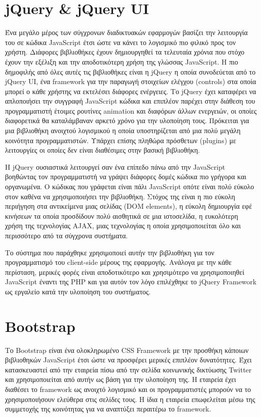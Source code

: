 \section {jQuery \& jQuery UI}
Ένα μεγάλο μέρος των σύγχρονων διαδικτυακών εφαρμογών βασίζει την λειτουργία του σε κώδικα JavaScript έτσι ώστε να κάνει το λογισμικό πιο φιλικό προς τον χρήστη. Διάφορες βιβλιοθήκες έχουν δημιουργηθεί τα τελευταία χρόνια που στόχο έχουν την εξέλιξη και την αποδοτικότερη χρήση της γλώσσας JavaScript. Η πιο δημοφιλής από όλες αυτές τις βιβλιοθήκες είναι η jQuery η οποία συνοδεύεται από το jQuery UI, ένα framework για την παραγωγή στοιχείων ελέγχου (controls) στα οποία μπορεί ο κάθε χρήστης να εκτελέσει διάφορες ενέργειες. Το jQuery έχει καταφέρει να απλοποιήσει την συγγραφή JavaScript κώδικα και επιπλέον παρέχει στην διάθεση του προγραμματιστή έτοιμες ρουτίνες animation και διαφόρων άλλων ενεργειών, οι οποίες διαφορετικά θα καταλάμβαναν αρκετό χρόνο για την υλοποίηση τους. Πρόκειται για μια βιβλιοθήκη ανοιχτού λογισμικού η οποία υποστηρίζεται από μια πολύ μεγάλη κοινότητα προγραμματιστών. Υπάρχει επίσης πληθώρα πρόσθετων (plugins) με λειτουργίες οι οποίες δεν είναι διαθέσιμες στην βασική βιβλιοθήκη.

Η jQuery ουσιαστικά λειτουργεί σαν ένα επίπεδο πάνω από την JavaScript βοηθώντας τον προγραμματιστή να γράψει διάφορες δομές κώδικα πιο γρήγορα και οργανωμένα. Ο κώδικας που γράφεται είναι πάλι JavaScript οπότε είναι πολύ εύκολο στον καθένα να χρησιμοποιήσει την βιβλιοθήκη. Στόχος της είναι η πιο εύκολη περιήγηση στα αντικείμενα μιας σελίδας (DOM elements), η εύκολη δημιουργία εφέ κινήσεων τα οποία προσδίδουν πολύ αισθητικά σε μια ιστοσελίδα, η ευκολότερη χρήση της τεχνολογίας AJAX, μιας τεχνολογίας η οποία χρησιμοποιείται όλο και περισσότερο από τα σύγχρονα συστήματα.

Το σύστημα που παράχθηκε χρησιμοποιεί αυτήν την βιβλιοθήκη για τον προγραμματισμό του client-side μέρους της εφαρμογής. Ανάλογα με την κάθε περίσταση, μερικές φορές είναι αποδοτικότερο και χρησιμότερο να χρησιμοποιηθεί JavaScript έναντι της PHP και για αυτόν τον λόγο επιλέχθηκε το jQuery Framework ως εργαλείο κατά την υλοποίηση του συστήματος.

\section {Bootstrap}
Το Bootstrap είναι ένα ολοκληρωμένο CSS Framework με την προσθήκη κάποιων βιβλιοθηκών JavaScript έτσι ώστε να προσφέρει μερικές επιπλέον δυνατότητες. Έχει κατασκευαστεί από την εταιρεία πίσω από την σελίδα κοινωνικής δικτύωσης Twitter και χρησιμοποιείται από αυτήν ως βάση για την υλοποίηση της. Η εταιρεία έχει διαθέσει το framework ως ανοιχτό λογισμικό και οι προγραμματιστές μπορούν να το χρησιμοποιήσουν ελεύθερα στις σελίδες τους. Η ίδια η εταιρεία επωφελείται μέσω της συμμετοχής της κοινότητας για να αναπτύξει περαιτέρω το framework.

